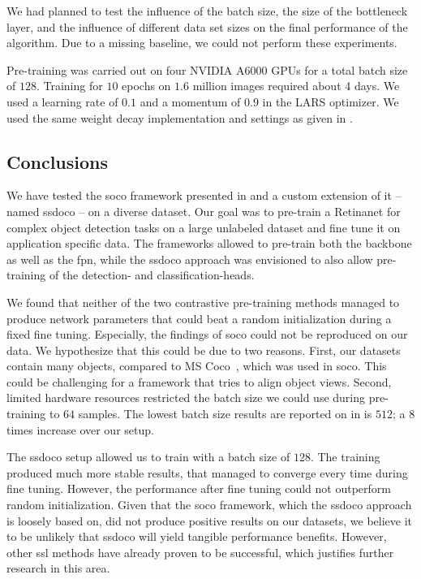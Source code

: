 We had planned to test the influence of the batch size, the size of the bottleneck layer, and the influence of different data set sizes on the final performance of the algorithm. Due to a missing baseline, we could not perform these experiments.

Pre-training was carried out on four NVIDIA A6000 GPUs for a total batch size of $128$. Training for $10$ epochs on $1.6$ million images required about 4 days. We used a learning rate of $0.1$ and a momentum of $0.9$ in the LARS optimizer. We used the same weight decay implementation and settings as given in \cite{Wei:2022aaa}.

\subsection{Conclusions}
We have tested the \acrshort{soco} framework presented in \cite{Wei:2021aaa} and a custom extension of it – named \acrshort{ssdoco} – on a diverse dataset. Our goal was to pre-train a Retinanet for complex object detection tasks on a large unlabeled dataset and fine tune it on application specific data. The frameworks allowed to pre-train both the backbone as well as the \acrshort{fpn}, while the \acrshort{ssdoco} approach was envisioned to also allow pre-training of the detection- and classification-heads.

We found that neither of the two contrastive pre-training methods managed to produce network parameters that could beat a random initialization during a fixed fine tuning. Especially, the findings of \acrshort{soco} could not be reproduced on our data. We hypothesize that this could be due to two reasons. First, our datasets contain many objects, compared to MS Coco~\cite{Lin:2014aaa}, which was used in \acrshort{soco}. This could be challenging for a framework that tries to align object views. Second, limited hardware resources restricted the batch size we could use during pre-training to $64$ samples. The lowest batch size results are reported on in \cite{Wei:2021aaa} is $512$; a $8$ times increase over our setup.

The \acrshort{ssdoco} setup allowed us to train with a batch size of $128$. The training produced much more stable results, that managed to converge every time during fine tuning. However, the performance after fine tuning could not outperform random initialization. Given that the \acrshort{soco} framework, which the \acrshort{ssdoco} approach is loosely based on, did not produce positive results on our datasets, we believe it to be unlikely that \acrshort{ssdoco} will yield tangible performance benefits. However, other \acrshort{ssl} methods have already proven to be successful, which justifies further research in this area.
